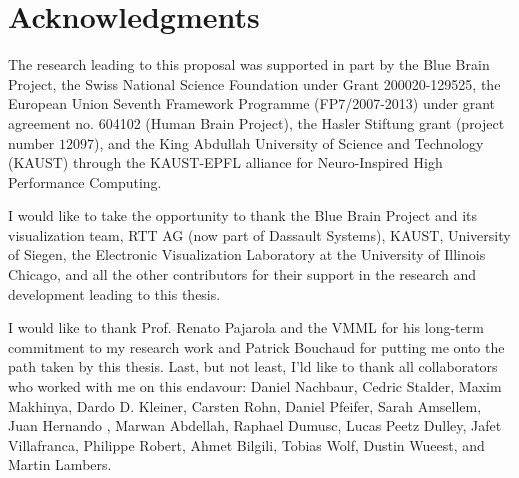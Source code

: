 

\chapter*{Acknowledgments}
The research leading to this proposal was supported in part by the Blue Brain
Project, the Swiss National Science Foundation under Grant 200020-129525, the
European Union Seventh Framework Programme (FP7/2007-2013) under grant agreement
no. 604102 (Human Brain Project), the Hasler Stiftung grant (project number
$12097$), and the King Abdullah University of Science and Technology (KAUST)
through the KAUST-EPFL alliance for Neuro-Inspired High Performance Computing.

I would like to take the opportunity to thank the Blue Brain Project and its
visualization team, RTT AG (now part of Dassault Systems), KAUST, University of
Siegen, the Electronic Visualization Laboratory at the University of Illinois
Chicago, and all the other contributors for their support in the research and
development leading to this thesis.

I would like to thank Prof. Renato Pajarola and the VMML for his long-term
commitment to my research work and Patrick Bouchaud for putting me onto the
path taken by this thesis. Last, but not least, I'ld like to thank all
collaborators who worked with me on this endavour: Daniel Nachbaur, Cedric
Stalder, Maxim Makhinya, Dardo D. Kleiner, Carsten Rohn, Daniel Pfeifer, Sarah
Amsellem, Juan Hernando , Marwan Abdellah, Raphael Dumusc, Lucas Peetz Dulley,
Jafet Villafranca, Philippe Robert, Ahmet Bilgili, Tobias Wolf, Dustin Wueest,
and Martin Lambers.
